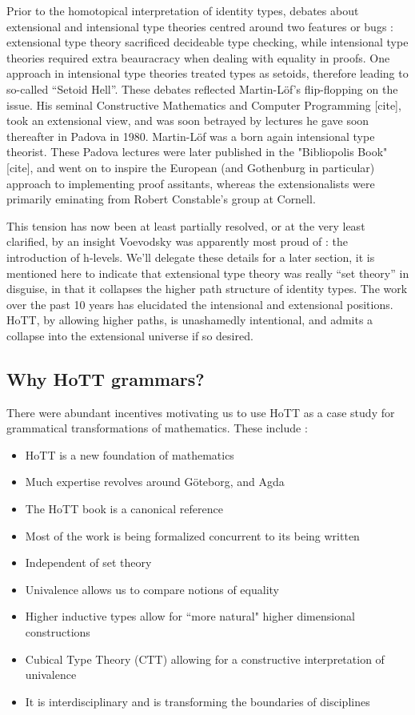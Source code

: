 Prior to the homotopical interpretation of identity types, debates about
extensional and intensional type theories centred around two features or bugs :
extensional type theory sacrificed decideable type checking, while intensional
type theories required extra beauracracy when dealing with equality in proofs.
One approach in intensional type theories treated types as setoids, therefore
leading to so-called ``Setoid Hell''. These debates reflected Martin-Löf's
flip-flopping on the issue. His seminal Constructive Mathematics and Computer
Programming [cite], took an extensional view, and was soon betrayed by lectures
he gave soon thereafter in Padova in 1980. Martin-Löf was a born again
intensional type theorist. These Padova lectures were later published in the
"Bibliopolis Book" [cite], and went on to inspire the European (and Gothenburg
in particular) approach to implementing proof assitants, whereas the
extensionalists were primarily eminating from Robert Constable's group at
Cornell.

This tension has now been at least partially resolved, or at the very least
clarified, by an insight Voevodsky was apparently most proud of : the
introduction of h-levels. We'll delegate these details for a later section, it
is mentioned here to indicate that extensional type theory was really ``set
theory'' in disguise, in that it collapses the higher path structure of
identity types. The work over the past 10 years has elucidated the intensional
and extensional positions. HoTT, by allowing higher paths, is unashamedly
intentional, and admits a collapse into the extensional universe if so desired.

\subsection{Why HoTT grammars?}

There were abundant incentives motivating us to use HoTT as a case study for
grammatical transformations of mathematics.  These include :

\begin{itemize}[noitemsep]
\item HoTT is a new foundation of mathematics
\item Much expertise revolves around Göteborg, and Agda 
\item The HoTT book is a canonical reference
\item Most of the work is being formalized concurrent to its being written 
\item Independent of set theory
\item Univalence allows us to compare notions of equality
\item Higher inductive types allow for ``more natural" higher dimensional constructions
\item Cubical Type Theory (CTT) allowing for a constructive interpretation of univalence
\item It is interdisciplinary and is transforming the boundaries of disciplines
\end{itemize}

